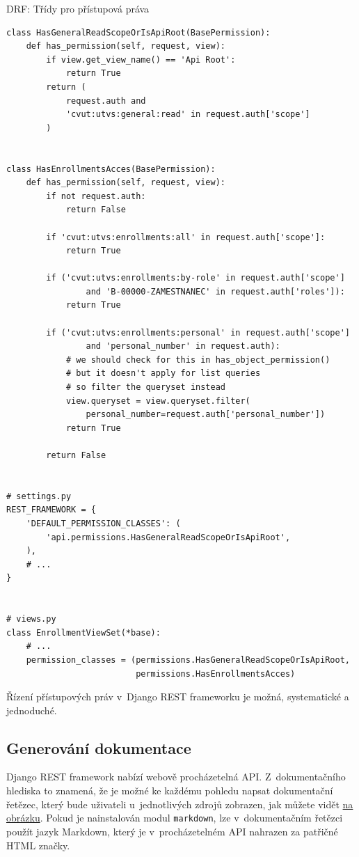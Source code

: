 \begin{listing}[htbp]
\caption{{\label{code:drf:permissions}DRF: Třídy pro přístupová práva}}
\begin{verbatim}
class HasGeneralReadScopeOrIsApiRoot(BasePermission):
    def has_permission(self, request, view):
        if view.get_view_name() == 'Api Root':
            return True
        return (
            request.auth and
            'cvut:utvs:general:read' in request.auth['scope']
        )


class HasEnrollmentsAcces(BasePermission):
    def has_permission(self, request, view):
        if not request.auth:
            return False

        if 'cvut:utvs:enrollments:all' in request.auth['scope']:
            return True

        if ('cvut:utvs:enrollments:by-role' in request.auth['scope']
                and 'B-00000-ZAMESTNANEC' in request.auth['roles']):
            return True

        if ('cvut:utvs:enrollments:personal' in request.auth['scope']
                and 'personal_number' in request.auth):
            # we should check for this in has_object_permission()
            # but it doesn't apply for list queries
            # so filter the queryset instead
            view.queryset = view.queryset.filter(
                personal_number=request.auth['personal_number'])
            return True

        return False


# settings.py
REST_FRAMEWORK = {
    'DEFAULT_PERMISSION_CLASSES': (
        'api.permissions.HasGeneralReadScopeOrIsApiRoot',
    ),
    # ...
}


# views.py
class EnrollmentViewSet(*base):
    # ...
    permission_classes = (permissions.HasGeneralReadScopeOrIsApiRoot,
                          permissions.HasEnrollmentsAcces)
\end{verbatim}
\end{listing}

Řízení přístupových práv v~Django REST frameworku je možná, systematické a jednoduché.

\subsection{Generování dokumentace}\label{generovuxe1nuxed-dokumentace}

Django REST framework nabízí webově procházetelná API. Z~dokumentačního hlediska to znamená, že je možné ke každému pohledu napsat dokumentační řetězec, který bude uživateli u~jednotlivých zdrojů zobrazen, jak můžete vidět \protect\hyperlink{pic:djangorestbrowsableutvs}{na obrázku}. Pokud je nainstalován modul \verb!markdown!, lze v~dokumentačním řetězci použít jazyk Markdown, který je v~procházetelném API nahrazen za patřičné HTML značky.

